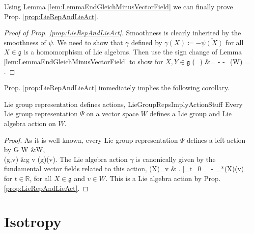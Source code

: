 Using Lemma \ref{lem:LemmaEndGleichMinusVectorField} we can finally prove Prop. \ref{prop:LieRepAndLieAct}.

\begin{proof}[Proof of Prop. \ref{prop:LieRepAndLieAct}]
\leavevmode\newline
Smoothness is clearly inherited by the smoothness of $\psi$. We need to show that $\gamma$ defined by $\gamma(X) \coloneqq - \overline{\psi(X)}$ for all $X \in \mathfrak{g}$ is a homomorphism of Lie algebras. Then use the sign change of Lemma \ref{lem:LemmaEndGleichMinusVectorField} to show for $X, Y \in \mathfrak{g}$
\bas
\gamma\mleft(\mleft[ X, Y \mright]_{}\mright)
&=
-
-_{(W)}
\stackrel{\ref{lem:LemmaEndGleichMinusVectorField}}{=}
=
.
\eas
\end{proof}

Prop. \ref{prop:LieRepAndLieAct} immediately implies the following corollary.

\begin{corollaries}{Lie group representation defines actions, \newline \cite[Example 3.4.2, page 143f.]{hamilton}}{LieGroupRepsImplyActionStuff}
Every Lie group representation $\Psi$ on a vector space $W$ defines a Lie group and Lie algebra action on $W$.
\end{corollaries}

\begin{proof}
\leavevmode\newline
As it is well-known, every Lie group representation $\Psi$ defines a left action by
\bas
G \times W &\to W, \\
(g,v) &\mapsto g \cdot v \coloneqq \Psi(g)(v).
\eas
The Lie algebra action $\gamma$ is canonically given by the fundamental vector fields related to this action,
\bas
\gamma(X)_v 
&\coloneqq
\mleft. \mright|_{t=0}
=
- \Psi_*(X)(v)
\eas
for $t \in \mathbb{R}$, for all $X \in \mathfrak{g}$ and $v \in W$. This is a Lie algebra action by Prop. \ref{prop:LieRepAndLieAct}.
\end{proof}

\section{Isotropy}\label{IsotropyClassical}

